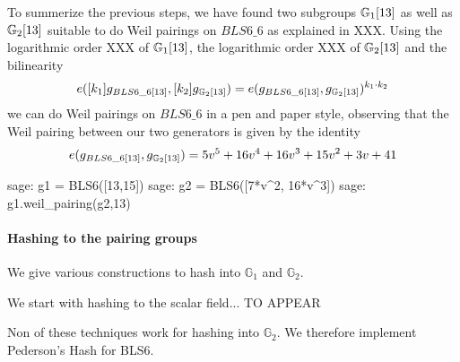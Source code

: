 To summerize the previous steps, we have found two subgroups $\mathbb{G}_1[13]$ as well as $\mathbb{G}_2[13]$ suitable to do Weil pairings on $BLS6\_6$ as explained in XXX. Using the logarithmic order XXX of $\mathbb{G}_1[13]$, the logarithmic order XXX of $\mathbb{G}_2[13]$ and the bilinearity
$$
e([k_1]g_{BLS6\_6[13]},[k_2]g_{\mathbb{G}_2[13]}) =
e(g_{BLS6\_6[13]},g_{\mathbb{G}_2[13]})^{k_1\cdot k_2}
$$
we can do Weil pairings on $BLS6\_6$ in a pen and paper style, observing that the Weil pairing between our two generators is given by the identity
$$
e(g_{BLS6\_6[13]},g_{\mathbb{G}_2[13]})= 5v^5 + 16v^4 + 16v^3 + 15v^2 + 3v + 41
$$
\begin{sagecommandline}
sage: g1 = BLS6([13,15])
sage: g2 = BLS6([7*v^2, 16*v^3])
sage: g1.weil_pairing(g2,13)
\end{sagecommandline}
\paragraph{Hashing to the pairing groups}
We give various constructions to hash into $\mathbb{G}_1$ and $\mathbb{G}_2$.

We start with hashing to the scalar field... TO APPEAR

Non of these techniques work for hashing into $\mathbb{G}_2$. We therefore implement Pederson's Hash for BLS6.

